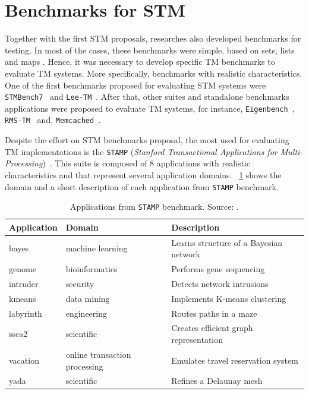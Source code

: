 \section{Benchmarks for STM}\label{sec:STAMP}
Together with the first STM proposals, researches also developed benchmarks for testing. In most of the cases, these benchmarks were simple, based on sets, lists and maps \cite{Herlihy:2003_2, Harris:2003, Scherer:2005, Riegel:2006, Dice:2007}. Hence, it was necessary to develop specific TM benchmarks to evaluate TM systems. More specifically, benchmarks with realistic characteristics. One of the first benchmarks proposed for evaluating STM systems were \texttt{STMBench7}~\cite{STMBench7} and \texttt{Lee-TM}~\cite{LeeTM}. After that, other suites and standalone benchmarks applications were proposed to evaluate TM systems, for instance, \texttt{Eigenbench}~\cite{Eigenbench}, \texttt{RMS-TM}~\cite{Kestor:2011}
and, \texttt{Memcached}~\cite{Ruan:2014_2}.

Despite the effort on STM benchmarks proposal, the most used for evaluating TM implementations is the \texttt{STAMP} (\textit{Stanford Transactional Applications for Multi-Processing})~\cite{STAMP}. This suite is composed of 8 applications with realistic characteristics and that represent several application domains. \tablename~\ref{tab:stampSummary} shows the domain and a short description of each application from \texttt{STAMP} benchmark.

\begin{table}[!tb]
	\centering
	\caption{Applications from \texttt{STAMP} benchmark. Source: \cite{STAMP}.}
	\label{tab:stampSummary}
	\begin{tabular}{@{}lll@{}}
		\toprule
		\textbf{Application} & \textbf{Domain}               & \textbf{Description}                   \\ \midrule
		bayes                & machine learning              & Learns structure of a Bayesian network \\
		genome               & bioinformatics                & Performs gene sequencing               \\
		intruder             & security                      & Detects network intrusions             \\
		kmeans               & data mining                   & Implements K-means clustering          \\
		labyrinth            & engineering                   & Routes paths in a maze                   \\
		ssca2                & scientific                    & Creates efficient graph representation \\
		vacation             & online transaction processing & Emulates travel reservation system     \\
		yada                 & scientific                    & Refines a Delaunay mesh                \\ \bottomrule
	\end{tabular}
\end{table}

